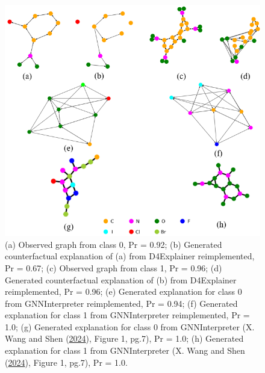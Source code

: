 \documentclass[
  11pt,
  letterpaper,
]{article}
\begin{document}
\begin{figure}

{\centering \includegraphics[width=1\textwidth,height=1\textheight]{figures/mutag_plot_together.png}

}

\caption{\label{fig-results}(a) Observed graph from class 0, Pr = 0.92;
(b) Generated counterfactual explanation of (a) from D4Explainer
reimplemented, Pr = 0.67; (c) Observed graph from class 1, Pr = 0.96;
(d) Generated counterfactual explanation of (b) from D4Explainer
reimplemented, Pr = 0.96; (e) Generated explanation for class 0 from
GNNInterpreter reimplemented, Pr = 0.94; (f) Generated explanation for
class 1 from GNNInterpreter reimplemented, Pr = 1.0; (g) Generated
explanation for class 0 from GNNInterpreter (X. Wang and Shen
(\protect\hyperlink{ref-Wang_Shen_2024}{2024}), Figure 1, pg.7), Pr =
1.0; (h) Generated explanation for class 1 from GNNInterpreter (X. Wang
and Shen (\protect\hyperlink{ref-Wang_Shen_2024}{2024}), Figure 1,
pg.7), Pr = 1.0.}

\end{figure}
\end{document}
